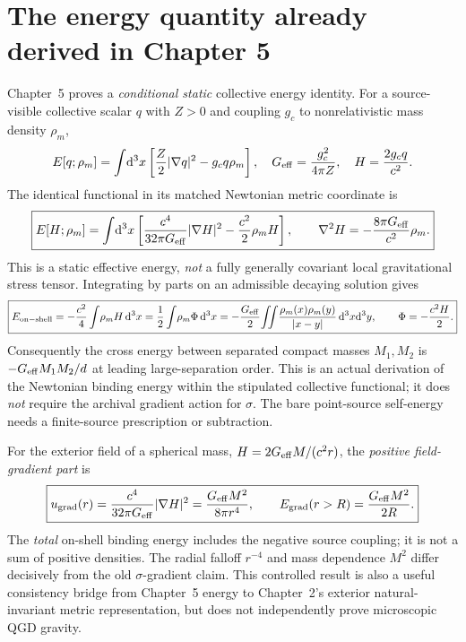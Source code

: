 \documentclass[11pt,a4paper]{article}
\theoremstyle{definition}\newtheorem{definition}[theorem]{Definition}
\theoremstyle{remark}\newtheorem{remark}[theorem]{Remark}
\newcommand{\dd}{\mathrm d}
\begin{document}
\section{The energy quantity already derived in Chapter 5}
\label{sec:staticenergy}
Chapter~5 proves a \emph{conditional static} collective energy identity. For a source-visible collective scalar $q$ with $Z>0$ and coupling $g_c$ to nonrelativistic mass density $\rho_m$,
\begin{equation}\label{eq:ch6-collective-E}
E[q;\rho_m]=\int\!\dd^3x\left[\frac Z2|\nabla q|^2-g_c q\rho_m\right],\quad
G_{\rm eff}=\frac{g_c^2}{4\pi Z},\quad H=\frac{2g_cq}{c^2}.
\end{equation}
The identical functional in its matched Newtonian metric coordinate is
\begin{equation}\label{eq:ch6-EH}
\boxed{E[H;\rho_m]=\int\!\dd^3x\left[\frac{c^4}{32\pi G_{\rm eff}}|\nabla H|^2-\frac{c^2}{2}\rho_mH\right],\qquad
\nabla^2H=-\frac{8\pi G_{\rm eff}}{c^2}\rho_m.}
\end{equation}
This is a static effective energy, \emph{not} a fully generally covariant local gravitational stress tensor. Integrating by parts on an admissible decaying solution gives
\begin{equation}\label{eq:on-shell-energy}
\boxed{E_{\rm on-shell}= -\frac{c^2}{4}\int\!\rho_mH\,\dd^3x
=\frac12\int\!\rho_m\Phi\,\dd^3x
=-\frac{G_{\rm eff}}2\!\iint\!\frac{\rho_m(x)\rho_m(y)}{|x-y|}\,\dd^3x\dd^3y,\qquad\Phi=-\frac{c^2H}{2}.}
\end{equation}
Consequently the cross energy between separated compact masses $M_1,M_2$ is $-G_{\rm eff}M_1M_2/d$ at leading large-separation order. This is an actual derivation of the Newtonian binding energy within the stipulated collective functional; it does \emph{not} require the archival gradient action for $\sigma$. The bare point-source self-energy needs a finite-source prescription or subtraction.

For the exterior field of a spherical mass, $H=2G_{\rm eff}M/(c^2r)$, the \emph{positive field-gradient part} is
\begin{equation}\label{eq:outer-energy}
\boxed{u_{\rm grad}(r)=\frac{c^4}{32\pi G_{\rm eff}}|\nabla H|^2=\frac{G_{\rm eff}M^2}{8\pi r^4},\qquad
E_{\rm grad}(r>R)=\frac{G_{\rm eff}M^2}{2R}.}
\end{equation}
The \emph{total} on-shell binding energy includes the negative source coupling; it is not a sum of positive densities. The radial falloff $r^{-4}$ and mass dependence $M^2$ differ decisively from the old $\sigma$-gradient claim. This controlled result is also a useful consistency bridge from Chapter~5 energy to Chapter~2's exterior natural-invariant metric representation, but does not independently prove microscopic QGD gravity.
\end{document}
